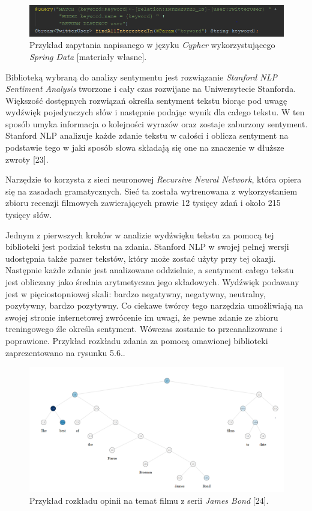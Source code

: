 \begin{figure}[h] %
	\centering
	\includegraphics[width=1.0\linewidth]{img/tools_neo4j_1}
	\caption{Przykład zapytania napisanego w języku \textit{Cypher} wykorzystującego \textit{Spring Data} [materiały własne].}
\end{figure}

Biblioteką wybraną do analizy sentymentu jest rozwiązanie \textit{Stanford NLP Sentiment Analysis} tworzone i cały czas rozwijane na Uniwersytecie Stanforda. Większość dostępnych rozwiązań określa sentyment tekstu biorąc pod uwagę wydźwięk pojedynczych słów i następnie podając wynik dla całego tekstu. W ten sposób umyka informacja o kolejności wyrazów oraz zostaje zaburzony sentyment. Stanford NLP analizuje każde zdanie tekstu w całości i oblicza sentyment na podstawie tego w jaki sposób słowa składają się one na znaczenie w dłuższe zwroty [23]. 

Narzędzie to korzysta z sieci neuronowej \textit{Recursive Neural Network}, która opiera się na zasadach gramatycznych. Sieć ta została wytrenowana z wykorzystaniem zbioru recenzji filmowych zawierających prawie 12 tysięcy zdań i około 215 tysięcy słów.

Jednym z pierwszych kroków w analizie wydźwięku tekstu za pomocą tej biblioteki jest podział tekstu na zdania. Stanford NLP w swojej pełnej wersji udostępnia także parser tekstów, który może zostać użyty przy tej okazji. Następnie każde zdanie jest analizowane oddzielnie, a sentyment całego tekstu jest obliczany jako średnia arytmetyczna jego składowych. Wydźwięk podawany jest w pięciostopniowej skali: bardzo negatywny, negatywny, neutralny, pozytywny, bardzo pozytywny. Co ciekawe twórcy tego narzędzia umożliwiają na swojej stronie internetowej zwrócenie im uwagi, że pewne zdanie ze zbioru treningowego źle określa sentyment. Wówczas zostanie to przeanalizowane i poprawione. Przykład rozkładu zdania za pomocą omawionej biblioteki zaprezentowano na rysunku 5.6..

\begin{figure}[h] %
	\centering
	\includegraphics[width=1.0\linewidth]{img/nlp_stanford_nlp_bond}
	\caption{Przykład rozkładu opinii na temat filmu z serii \textit{James Bond} [24].}
\end{figure}

